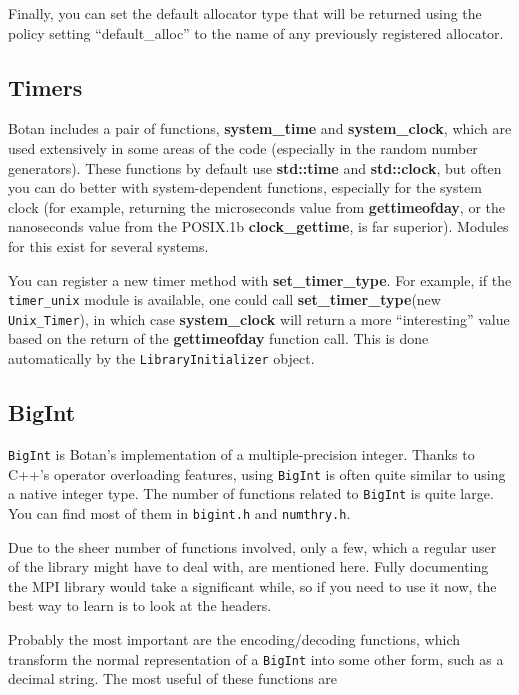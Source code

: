 \documentclass{article}
\newcommand{\filename}[1]{\texttt{#1}}
\newcommand{\function}[1]{\textbf{#1}}
\newcommand{\type}[1]{\texttt{#1}}
\begin{document}
Finally, you can set the default allocator type that will be returned using
the policy setting ``default\_alloc'' to the name of any previously registered
allocator.

\subsection{Timers}

Botan includes a pair of functions, \function{system\_time} and
\function{system\_clock}, which are used extensively in some areas of the code
(especially in the random number generators). These functions by default use
\function{std::time} and \function{std::clock}, but often you can do better
with system-dependent functions, especially for the system clock (for example,
returning the microseconds value from \function{gettimeofday}, or the
nanoseconds value from the POSIX.1b \function{clock\_gettime}, is far
superior). Modules for this exist for several systems.

You can register a new timer method with \function{set\_timer\_type}. For
example, if the \texttt{timer\_unix} module is available, one could call
\function{set\_timer\_type}(new \type{Unix\_Timer}), in which case
\function{system\_clock} will return a more ``interesting'' value based on the
return of the \function{gettimeofday} function call. This is done automatically
by the \type{LibraryInitializer} object.

\subsection{BigInt}

\type{BigInt} is Botan's implementation of a multiple-precision
integer. Thanks to C++'s operator overloading features, using \type{BigInt} is
often quite similar to using a native integer type. The number of functions
related to \type{BigInt} is quite large. You can find most of them in
\filename{bigint.h} and \filename{numthry.h}.

Due to the sheer number of functions involved, only a few, which a regular user
of the library might have to deal with, are mentioned here. Fully documenting
the MPI library would take a significant while, so if you need to use it now,
the best way to learn is to look at the headers.

Probably the most important are the encoding/decoding functions, which
transform the normal representation of a \type{BigInt} into some other form,
such as a decimal string. The most useful of these functions are
\end{document}
